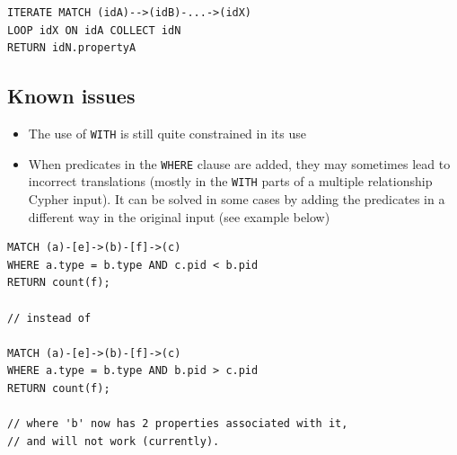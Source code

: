 \documentclass[letterpaper]{ltxdoc}
\begin{document}
\begin{lstlisting}[language = Cypher]
ITERATE MATCH (idA)-->(idB)-...->(idX)
LOOP idX ON idA COLLECT idN
RETURN idN.propertyA
\end{lstlisting}

\subsection{Known issues}
\begin{itemize}
\item The use of \texttt{WITH} is still quite constrained in its use
\item When predicates in the \texttt{WHERE} clause are added, they may sometimes lead to incorrect translations (mostly in the \texttt{WITH} parts of a multiple relationship Cypher input). It can be solved in some cases by adding the predicates in a different way in the original input (see example below)
\end{itemize}

\begin{lstlisting}[language = Cypher]
MATCH (a)-[e]->(b)-[f]->(c)
WHERE a.type = b.type AND c.pid < b.pid
RETURN count(f);

// instead of

MATCH (a)-[e]->(b)-[f]->(c)
WHERE a.type = b.type AND b.pid > c.pid
RETURN count(f);

// where 'b' now has 2 properties associated with it,
// and will not work (currently).
\end{lstlisting}
\end{document}

